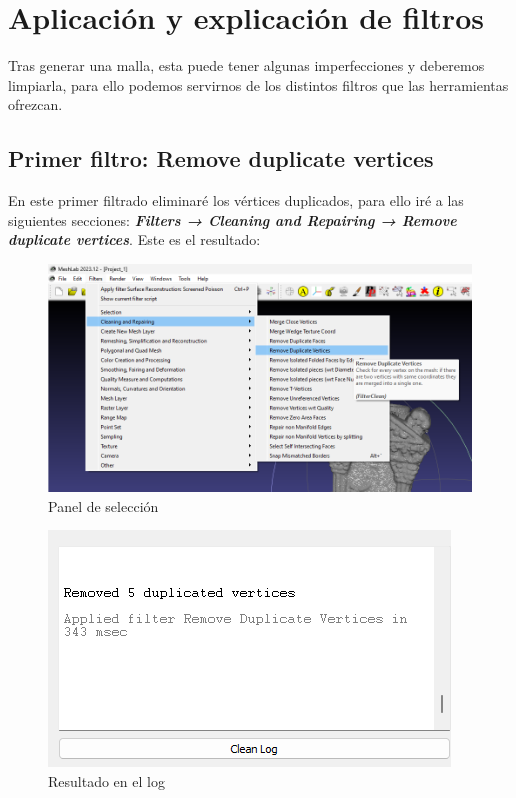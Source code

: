 \documentclass{article}
\begin{document}
\pagebreak

\section{Aplicación y explicación de filtros}

Tras generar una malla, esta puede tener algunas imperfecciones y deberemos limpiarla, para ello podemos servirnos de los distintos filtros que las herramientas ofrezcan.

\subsection{Primer filtro: Remove duplicate vertices}

En este primer filtrado eliminaré los vértices duplicados, para ello iré a las siguientes secciones: \textbf{\textit{Filters → Cleaning and Repairing → Remove duplicate vertices}}. Este es el resultado:

\begin{figure}[H]
    \centering
    \includegraphics[scale=0.44]{images/filtro_03.png}
    \caption{Panel de selección}
\end{figure}

\begin{figure}[H]
    \centering
    \includegraphics[scale=0.65]{images/filtro_01.png}
    \caption{Resultado en el log}
\end{figure}
\end{document}
